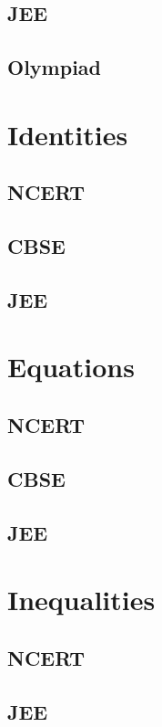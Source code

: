 \documentclass[journal]{IEEEtran}
\begin{document}
\subsection{JEE}

\subsection{Olympiad}

%
\section{Identities}
\subsection{NCERT}
 
\subsection{CBSE}
 
\subsection{JEE}
 
\section{Equations}
\subsection{NCERT}
 
\subsection{CBSE}
 
\subsection{JEE}
 
\section{Inequalities}
\subsection{NCERT}

\subsection{JEE}

\fi
\end{document}
